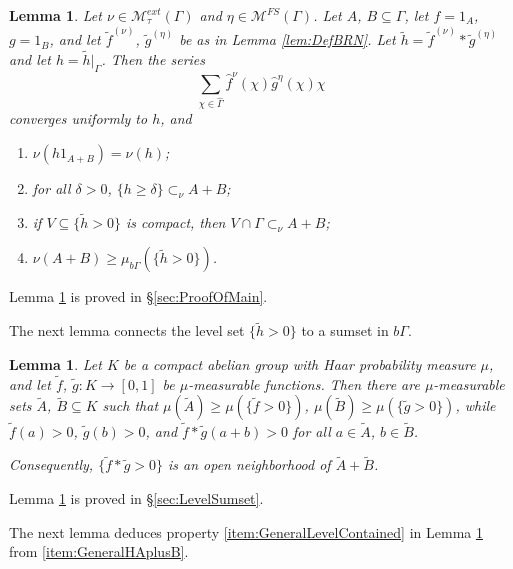 \documentclass[12pt]{amsart} \usepackage{amsmath,centernot,amssymb,leftindex}
\newtheorem{lemma}[theorem]{Lemma}
\numberwithin{theorem}{section}
\numberwithin{equation}{section}
\theoremstyle{definition}
\begin{document}
	\begin{lemma}\label{lem:Main}
	Let $\nu\in \mathcal M_{\tau}^{ext}(\Gamma)$ and $\eta\in \mathcal M^{FS}(\Gamma)$.  Let $A$, $B\subseteq \Gamma$,  let $f=1_A$, $g=1_B$, and let $\tilde{f}^{(\nu)}$, $\tilde{g}^{(\eta)}$ be as in Lemma \ref{lem:DefBRN}.  Let $\tilde{h}=\tilde{f}^{(\nu)}*\tilde{g}^{(\eta)}$ and let $h=\tilde{h}|_{\Gamma}$.  Then the series
	\begin{equation}\label{eq:NuEtaConvolutionExpansion}
		\sum_{\chi\in\widehat{\Gamma}} \hat{f}^{\nu}(\chi)\hat{g}^{\eta}(\chi)\chi
	\end{equation}
converges uniformly to $h$, and
	\begin{enumerate}
				\item\label{item:GeneralHAplusB} $\nu(h1_{A+B})=\nu(h)$;
		\item\label{item:GeneralLevelContained} for all $\delta>0$, $\{h\geq \delta\}\subset_\nu A+B$;
		\item\label{item:GeneralClopenSubset} if $V\subseteq \{\tilde{h}>0\}$ is compact, then $V\cap \Gamma \subset_{\nu} A+B$;
		\item\label{item:GeneralMeasureOfAplusB} $\nu(A+B)\geq \mu_{b\Gamma}(\{\tilde{h}>0\})$.
	\end{enumerate}
 \end{lemma}
 Lemma \ref{lem:Main} is proved in \S\ref{sec:ProofOfMain}.
 
 
 
 The next lemma connects the level set $\{\tilde{h}>0\}$ to a sumset in $b\Gamma$.
 
 
 
 \begin{lemma}\label{lem:LevelSetSumset}
 	Let $K$ be a compact abelian group with Haar probability measure $\mu$, and let $\tilde{f}$, $\tilde{g}:K\to [0,1]$ be $\mu$-measurable functions. Then there are $\mu$-measurable sets $\tilde{A}$, $\tilde{B}\subseteq K$ such that $\mu(\tilde{A})\geq \mu(\{\tilde{f}>0\})$, $\mu(\tilde{B})\geq \mu(\{\tilde{g}>0\})$, while  
 	$\tilde{f}(a)>0$, $\tilde{g}(b)>0$, and $\tilde{f}*\tilde{g}(a+b)>0$ for all $a\in \tilde{A}$, $b\in \tilde{B}$.
 	
 	Consequently, $\{\tilde{f}*\tilde{g}>0\}$ is an open neighborhood of $\tilde{A}+\tilde{B}$.
 \end{lemma}
 
 Lemma \ref{lem:LevelSetSumset} is proved in \S\ref{sec:LevelSumset}.  
 
  The next lemma deduces property  \ref{item:GeneralLevelContained} in Lemma \ref{lem:Main} from \ref{item:GeneralHAplusB}.
 
\end{document}
